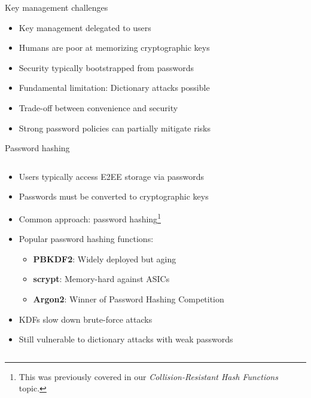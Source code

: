 \documentclass[aspectratio=169, lualatex, handout]{beamer}
\begin{document}
\begin{frame}{Key management challenges}
	\begin{itemize}
		\item Key management delegated to users
		\item Humans are poor at memorizing cryptographic keys
		\item Security typically bootstrapped from passwords
		\item Fundamental limitation: Dictionary attacks possible
		\item Trade-off between convenience and security
		\item Strong password policies can partially mitigate risks
	\end{itemize}
\end{frame}

\begin{frame}{Password hashing}
	\begin{columns}[c]
		\begin{column}{1\textwidth}
			\begin{itemize}
				\item Users typically access E2EE storage via passwords
				\item Passwords must be converted to cryptographic keys
				\item Common approach: password hashing\footnote{This was previously covered in our \textit{Collision-Resistant Hash Functions} topic.}
				\item Popular password hashing functions:
				      \begin{itemize}
					      \item \textbf{PBKDF2}: Widely deployed but aging
					      \item \textbf{scrypt}: Memory-hard against ASICs
					      \item \textbf{Argon2}: Winner of Password Hashing Competition
				      \end{itemize}
				\item KDFs slow down brute-force attacks
				\item Still vulnerable to dictionary attacks with weak passwords
			\end{itemize}
		\end{column}
	\end{columns}
\end{frame}
\end{document}
